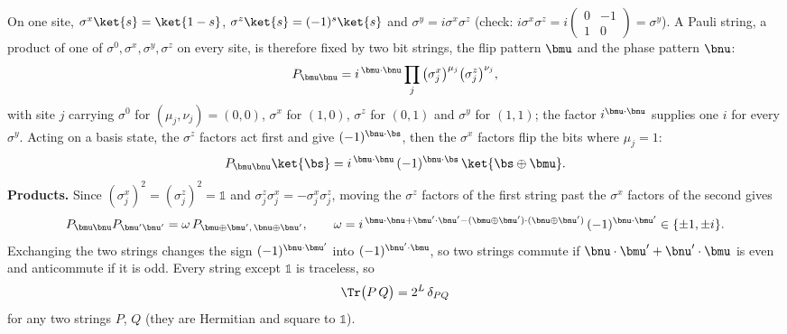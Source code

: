 On one site, $\sigma^x\ket{s} = \ket{1-s}$, $\sigma^z\ket{s} = (-1)^s\ket{s}$ and $\sigma^y = i\sigma^x\sigma^z$ (check: $i\sigma^x\sigma^z = i\begin{pmatrix}0&-1\\1&0\end{pmatrix} = \sigma^y$). A Pauli string, a product of one of $\sigma^0, \sigma^x, \sigma^y, \sigma^z$ on every site, is therefore fixed by two bit strings, the flip pattern $\bmu$ and the phase pattern $\bnu$:
\begin{equation}
P_{\bmu\bnu} = i^{\,\bmu\cdot\bnu}\prod_{j}\big(\sigma^x_j\big)^{\mu_j}\big(\sigma^z_j\big)^{\nu_j},
\label{eq:pauli}
\end{equation}
with site $j$ carrying $\sigma^0$ for $(\mu_j, \nu_j) = (0,0)$, $\sigma^x$ for $(1,0)$, $\sigma^z$ for $(0,1)$ and $\sigma^y$ for $(1,1)$; the factor $i^{\bmu\cdot\bnu}$ supplies one $i$ for every $\sigma^y$. Acting on a basis state, the $\sigma^z$ factors act first and give $(-1)^{\bnu\cdot\bs}$, then the $\sigma^x$ factors flip the bits where $\mu_j = 1$:
\begin{equation}
P_{\bmu\bnu}\ket{\bs} = i^{\,\bmu\cdot\bnu}\,(-1)^{\bnu\cdot\bs}\,\ket{\bs\oplus\bmu}.
\label{eq:pauli-action}
\end{equation}
\textbf{Products.} Since $(\sigma^x_j)^2 = (\sigma^z_j)^2 = \mathds 1$ and $\sigma^z_j\sigma^x_j = -\sigma^x_j\sigma^z_j$, moving the $\sigma^z$ factors of the first string past the $\sigma^x$ factors of the second gives
\begin{equation}
P_{\bmu\bnu}P_{\bmu'\bnu'} = \omega\, P_{\bmu\oplus\bmu',\,\bnu\oplus\bnu'}, \qquad
\omega = i^{\,\bmu\cdot\bnu + \bmu'\cdot\bnu' - (\bmu\oplus\bmu')\cdot(\bnu\oplus\bnu')}\,(-1)^{\bnu\cdot\bmu'} \in \{\pm1, \pm i\}.
\end{equation}
Exchanging the two strings changes the sign $(-1)^{\bnu\cdot\bmu'}$ into $(-1)^{\bnu'\cdot\bmu}$, so two strings commute if $\bnu\cdot\bmu' + \bnu'\cdot\bmu$ is even and anticommute if it is odd. Every string except $\mathds 1$ is traceless, so
\begin{equation}
\Tr\big(P\,Q\big) = 2^L\,\delta_{PQ}
\end{equation}
for any two strings $P$, $Q$ (they are Hermitian and square to $\mathds 1$).

